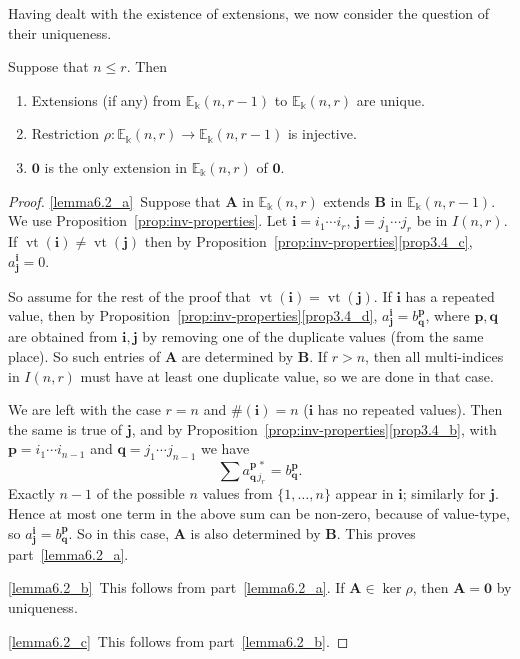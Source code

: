 \documentclass[ALCO,ThmDefs,Unicode,epreuves]{cedram}
\DeclareMathOperator{\vt}{vt}
\newcommand{\E}{\mathbb{E}}
\newcommand{\bi}{{\boldsymbol{i}}} %
\newcommand{\bj}{{\boldsymbol{j}}}
\newcommand{\bp}{{\boldsymbol{p}}}
\newcommand{\bq}{{\boldsymbol{q}}}
\newcommand{\bA}{\mathbf{A}}
\newcommand{\bB}{\mathbf{B}}
\newcommand{\bzero}{\mathbf{0}}
\begin{document}
Having dealt with the existence of extensions, we now consider the
question of their uniqueness.

\begin{lemm}\label{lem:rho-injects}
 Suppose that $n \le r$. Then
 \begin{enumerate}[label=(\alph*)]
 \item\label{lemma6.2_a} Extensions \textup{(}if any\textup{)} from $\E_\Bbbk(n,r-1)$
 to $\E_\Bbbk(n,r)$ are unique.
 \item\label{lemma6.2_b} Restriction $\rho: \E_\Bbbk(n,r) \to \E_\Bbbk(n,r-1)$ is
 injective.
 \item\label{lemma6.2_c} $\bzero$ is the only extension in $\E_\Bbbk(n,r)$ of $\bzero$.
 \end{enumerate}
\end{lemm}

\begin{proof}
\ref{lemma6.2_a}~Suppose that $\bA$ in $\E_\Bbbk(n,r)$ extends $\bB$ in
 $\E_\Bbbk(n,r-1)$. We use Proposition~\ref{prop:inv-properties}. Let
 $\bi = i_1 \cdots i_r$, $\bj = j_1 \cdots j_r$ be in $I(n,r)$. If
 $\vt(\bi) \ne \vt(\bj)$ then by Proposition~\ref{prop:inv-properties}\ref{prop3.4_c}, $a^\bi_\bj = 0$.

\goodbreak
 So assume for the rest of the proof that $\vt(\bi) = \vt(\bj)$. If
 $\bi$ has a repeated value, then by Proposition~\ref{prop:inv-properties}\ref{prop3.4_d}, $a^\bi_\bj = b^\bp_\bq$, where $\bp,
 \bq$ are obtained from $\bi, \bj$ by removing one of the duplicate
 values (from the same place). So such entries of $\bA$ are
 determined by $\bB$. If $r>n$, then all multi-indices in $I(n,r)$
 must have at least one duplicate value, so we are done in that case.

 We are left with the case $r=n$ and $\#(\bi) = n$ ($\bi$ has no
 repeated values). Then the same is true of $\bj$, and by Proposition~\ref{prop:inv-properties}\ref{prop3.4_b}, with $\bp = i_1 \cdots i_{n-1}$ and
 $\bq = j_1 \cdots j_{n-1}$ we have
 \[
 \textstyle \sum a^{\bp\,*}_{\bq\,j_r} = b^\bp_\bq .
 \]
 Exactly $n-1$ of the possible $n$ values from $\{1, \dots, n\}$
 appear in $\bi$; similarly for $\bj$. Hence at most one term in the
 above sum can be non-zero, because of value-type, so $a^\bi_\bj =
 b^\bp_\bq$. So in this case, $\bA$ is also determined by $\bB$. This
 proves part~\ref{lemma6.2_a}.

\ref{lemma6.2_b}~This follows from part~\ref{lemma6.2_a}. If $\bA \in \ker \rho$, then $\bA =
 \bzero$ by uniqueness.

\ref{lemma6.2_c}~This follows from part~\ref{lemma6.2_b}.
\end{proof}
\end{document}
